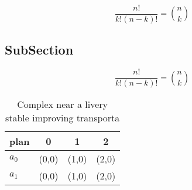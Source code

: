 \documentclass[a4paper]{article}
\begin{document}
\[ \frac{n!}{k!(n-k)!} = \binom{n}{k} \]

\subsection{SubSection}

\[ \frac{n!}{k!(n-k)!} = \binom{n}{k} \]

\begin{table}
\begin{adjustbox}{width=0.6\columnwidth}
\begin{tabular}{|l|l|l|l|}
\hline
\textbf{plan} & \multicolumn{1}{c|}{\textbf{0}} & \multicolumn{1}{c|}{\textbf{1}} & \multicolumn{1}{c|}{\textbf{2}} \\ \hline
\textbf{$a_0$}  & (0,0) & (1,0) & (2,0) \\ \hline
\textbf{$a_1$}  & (0,0) & (1,0) & (2,0) \\ \hline
\end{tabular}
\end{adjustbox}
\caption{Complex near a livery stable improving transporta
}
\end{table}
\end{document}
